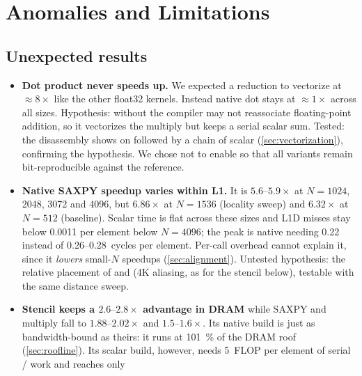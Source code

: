 \section{Anomalies and Limitations}\label{sec:anomalies}

\subsection{Unexpected results}
\begin{itemize}
  \item \textbf{Dot product never speeds up.} We expected a reduction to vectorize at $\approx8\times$
        like the other float32 kernels. Instead native dot stays at $\approx1\times$ across all sizes.
        Hypothesis: without  the compiler may not reassociate floating-point
        addition, so it vectorizes the multiply but keeps a serial scalar sum. Tested: the
        disassembly shows  on  followed by a chain of scalar 
        (\cref{sec:vectorization}), confirming the hypothesis. We chose not to enable
         so that all variants remain bit-reproducible against the reference.
  \item \textbf{Native SAXPY speedup varies within L1.} It is $5.6\text{--}5.9\times$ at
        $N=\num{1024}$, \num{2048}, \num{3072} and \num{4096}, but $6.86\times$ at $N=\num{1536}$
        (locality sweep) and $6.32\times$ at $N=512$ (baseline). Scalar time is flat across these
        sizes and L1D misses stay below \num{0.0011} per element below $N=\num{4096}$; the peak is
        native needing \num{0.22} instead of \numrange{0.26}{0.28}~cycles per element. Per-call
        overhead cannot explain it, since it \emph{lowers} small-$N$ speedups
        (\cref{sec:alignment}). Untested hypothesis: the relative placement of  and
         (4K aliasing, as for the stencil below), testable with the same distance sweep.
  \item \textbf{Stencil keeps a $2.6\text{--}2.8\times$ advantage in DRAM} while SAXPY and
        multiply fall to $1.88\text{--}2.02\times$ and $1.5\text{--}1.6\times$. Its native build is
        just as bandwidth-bound as theirs: it runs at \SI{101}{\percent} of the DRAM roof
        (\cref{sec:roofline}). Its scalar build, however, needs
        \num{5}~FLOP per element of serial / work and reaches only

\end{itemize}
